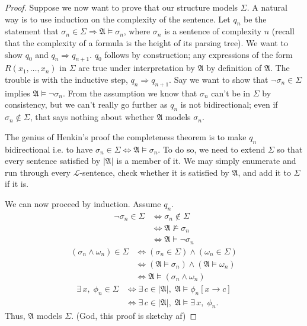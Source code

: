 \documentclass{article}
\theoremstyle{definition}
\begin{document}
\begin{proof}
	Suppose we now want to prove that our structure models $\Sigma$. A natural way is to use induction on the complexity of the sentence. Let $q_n$ be the statement that $\sigma_n\in\Sigma\Rightarrow \mathfrak{A}\models\sigma_n$, where $\sigma_n$ is a sentence of complexity $n$ (recall that the complexity of a formula is the height of its parsing tree). We want to show $q_0$ and $q_n\Rightarrow q_{n+1}$. $q_0$ follows by construction; any expressions of the form $R(x_1,\dots,x_n)$ in $\Sigma$ are true under interpretation by $\mathfrak{A}$ by definition of $\mathfrak{A}$. The trouble is with the inductive step, $q_n\Rightarrow q_{n+1}$. Say we want to show that $\neg\sigma_n\in\Sigma$ implies $\mathfrak{A}\models\neg\sigma_n$. From the assumption we know that $\sigma_n$ can't be in $\Sigma$ by consistency, but we can't really go further as $q_n$ is not bidirectional; even if $\sigma_n\not\in\Sigma$, that says nothing about whether $\mathfrak{A}$ models $\sigma_n$.\par
	The genius of Henkin's proof the completeness theorem is to make $q_n$ bidirectional i.e. to have $\sigma_n\in\Sigma\iff\mathfrak{A}\models\sigma_n$. To do so, we need to extend $\Sigma$ so that every sentence satisfied by $|\mathfrak{A}|$ is a member of it. We may simply enumerate and run through every $\mathcal{L}$-sentence, check whether it is satisfied by $\mathfrak{A}$, and add it to $\Sigma$ if it is.\par

	We can now proceed by induction. Assume $q_n$.
	\begin{align*}
		\neg\sigma_n\in\Sigma&\iff\sigma_n\not\in\Sigma\\
		&\iff\mathfrak{A}\not\models\sigma_n\\
		&\iff\mathfrak{A}\models\neg\sigma_n
	\end{align*}
	\begin{align*}
		(\sigma_n\land\omega_n)\in\Sigma&\iff(\sigma_n\in\Sigma)\land(\omega_n\in\Sigma)\\
		&\iff(\mathfrak{A}\models\sigma_n)\land(\mathfrak{A}\models\omega_n)\\
		&\iff\mathfrak{A}\models(\sigma_n\land\omega_n)
	\end{align*}
	\begin{align*}
		\exists\,x,\;\phi_n\in\Sigma&\iff\exists\,c\in|\mathfrak{A}|,\;\mathfrak{A}\models\phi_n[x\rightarrow c]\\
		&\iff\exists\,c\in|\mathfrak{A}|,\;\mathfrak{A}\models\exists\,x,\;\phi_n.
	\end{align*}
	Thus, $\mathfrak{A}$ models $\Sigma$. (God, this proof is sketchy af)
\end{proof}
\end{document}
